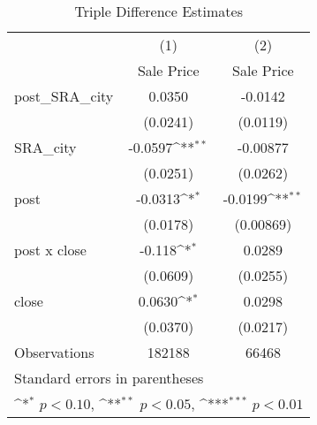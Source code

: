 \begin{table}[htbp]\centering
\def\sym#1{\ifmmode^{#1}\else\(^{#1}\)\fi}
\caption{Triple Difference Estimates\label{tabl}}
\begin{tabular}{l*{2}{c}}
\hline\hline
                    &\multicolumn{1}{c}{(1)}&\multicolumn{1}{c}{(2)}\\
                    &\multicolumn{1}{c}{Sale Price}&\multicolumn{1}{c}{Sale Price}\\
\hline
post\_SRA\_city       &      0.0350         &     -0.0142         \\
                    &    (0.0241)         &    (0.0119)         \\
[1em]
SRA\_city            &     -0.0597\sym{**} &    -0.00877         \\
                    &    (0.0251)         &    (0.0262)         \\
[1em]
post                &     -0.0313\sym{*}  &     -0.0199\sym{**} \\
                    &    (0.0178)         &   (0.00869)         \\
[1em]
post x close        &      -0.118\sym{*}  &      0.0289         \\
                    &    (0.0609)         &    (0.0255)         \\
[1em]
close               &      0.0630\sym{*}  &      0.0298         \\
                    &    (0.0370)         &    (0.0217)         \\
\hline
Observations        &      182188         &       66468         \\
\hline\hline
\multicolumn{3}{l}{\footnotesize Standard errors in parentheses}\\
\multicolumn{3}{l}{\footnotesize \sym{*} \(p<0.10\), \sym{**} \(p<0.05\), \sym{***} \(p<0.01\)}\\
\end{tabular}
\end{table}

